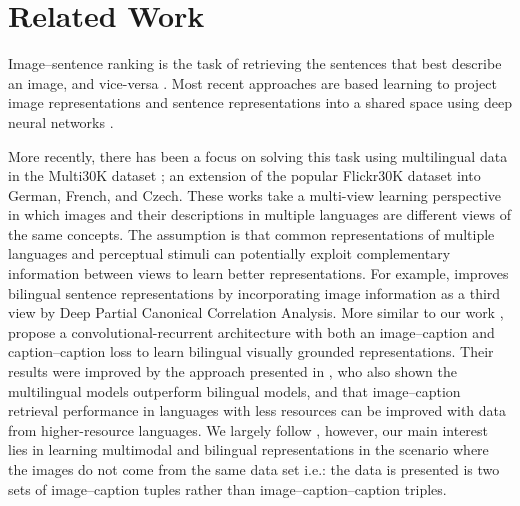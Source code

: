\section{Related Work}


Image--sentence ranking is the task of retrieving the sentences that best describe an image, and vice-versa \cite{hodosh2013framing}. Most recent approaches are based learning to project image representations and sentence representations into a shared space using deep neural networks \cite[\textit{inter-alia}]{frome2013devise,socher2014grounded,vendrov2016order,faghri2017vse++}. 

More recently, there has been a focus on solving this task using multilingual data \cite{D17-1303,kadar2018conll} in the Multi30K dataset \cite{W16-3210}; an extension of the popular Flickr30K dataset into German, French, and Czech.
These works take a multi-view learning perspective in which 
images and their descriptions in multiple languages are different views of the
same concepts. The assumption is that common representations of multiple languages and perceptual stimuli 
can potentially exploit complementary information
between views to learn better representations. 
For example,  improves bilingual sentence representations by incorporating image information as a third view by Deep Partial Canonical Correlation Analysis.
More similar to our work 
, propose a convolutional-recurrent architecture with both an image--caption
and caption--caption loss to learn bilingual visually grounded representations. 
Their results were improved by the approach presented in , who also
shown the multilingual models outperform bilingual models, and that image--caption retrieval 
performance in languages with less resources can be improved with data from higher-resource
languages. We largely follow \citet{kadar2018conll}, however, our main interest lies in learning multimodal
and bilingual representations in the scenario where the images do not come from the same
data set i.e.: the data is presented is two sets of image--caption tuples rather than
image--caption--caption triples.

